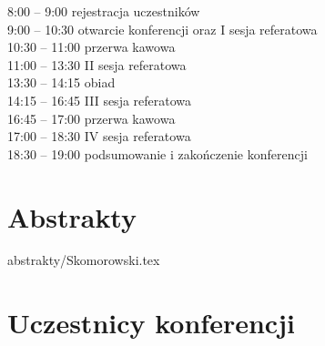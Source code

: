 \documentclass[12pt,oneside]{book}
\begin{document}
\Large{8:00 – 9:00 rejestracja uczestników\\
9:00 – 10:30 otwarcie konferencji oraz I sesja referatowa\\
10:30 – 11:00 przerwa kawowa\\
11:00 – 13:30 II  sesja referatowa \\
13:30 – 14:15 obiad\\
14:15 – 16:45 III sesja referatowa\\
16:45 – 17:00 przerwa kawowa\\
17:00 – 18:30 IV sesja referatowa\\
18:30 – 19:00 podsumowanie i zakończenie konferencji}

%
%

\large{
\tableofcontents
}
\mainmatter

\pagestyle{mainmatter}%


\chapter{Abstrakty}
\large
\vspace{-0.5cm}
 \label{bielecki}
\newpage
 \label{bilinska}
\newpage
 \label{dziembor}
\newpage
 \label{franczyk}
\newpage
 \label{guzik}
\newpage
 \label{kolendowicz}
\newpage
 \label{plewa}
\newpage 	
 \label{poreba}
\newpage 	
 {abstrakty/Skomorowski.tex} \label{skomorowski}
\newpage
 \label{wieczorek}
\newpage
 \label{sekowski}
\newpage
 \label{swider}
\newpage
 \label{pawliczek}
\newpage
 \label{cybulski}
\newpage
 \label{piasecki}
\newpage
 \label{sypniewski}



\chapter{Uczestnicy konferencji}
\end{document}
